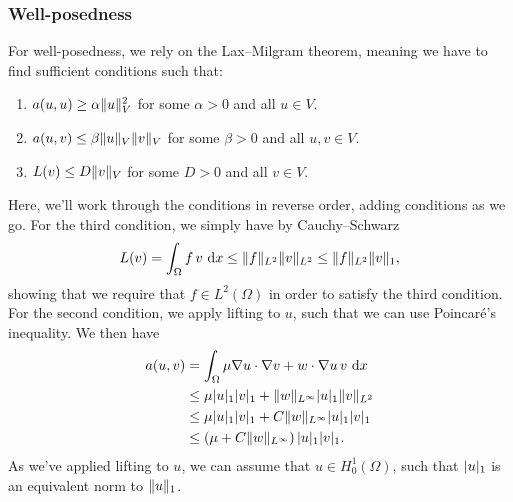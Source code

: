 \subsubsection{Well-posedness}
For well-posedness, we rely on the Lax--Milgram theorem, meaning we have to find sufficient conditions such that: %
\begin{enumerate}
    \item $a(u, u) \geq \alpha \lVert u\rVert^2_V$ for some $\alpha > 0$ and all $u \in V$.
    \item $a(u, v) \leq \beta \lVert u\rVert_V \lVert v\rVert_V$ for some $\beta > 0$ and all $u, v \in V$.
    \item $L(v) \leq D \lVert v\rVert_V$ for some $D > 0$ and all $v \in V$.
\end{enumerate}

Here, we'll work through the conditions in reverse order, adding conditions as we go.
For the third condition, we simply have by Cauchy--Schwarz %
\begin{equation}
    L(v) = \int_\Omega f \, v \, \mathop{}\!\mathrm{d} x \leq \lVert f\rVert_{L^2} \lVert v\rVert_{L^2} \leq \lVert f\rVert_{L^2} \lVert v\rVert_1,
\end{equation}
showing that we require that $f \in L^2(\Omega)$ in order to satisfy the third condition.
For the second condition, we apply lifting to $u$, such that we can use Poincaré's inequality.
We then have
\begin{align*}
    a(u, v)
    &= \int_{\Omega} \mu \nabla u \cdot \nabla v + w \cdot \nabla u \, v \, \mathop{}\!\mathrm{d} x \\
    &\leq \mu \lvert u\rvert_1 \lvert v\rvert_1 + \lVert w\rVert_{L^\infty} \lvert u\rvert_1 \lVert v\rVert_{L^2} \\
    &\leq \mu \lvert u\rvert_1 \lvert v\rvert_1 + C \lVert w\rVert_{L^\infty} \lvert u\rvert_1 \lvert v\rvert_1 \\
    &\leq \left( \mu + C \lVert w\rVert_{L^\infty} \right) \lvert u\rvert_1 \lvert v\rvert_1.
\end{align*}
As we've applied lifting to $u$, we can assume that $u \in H^1_0(\Omega)$, such that $\lvert u\rvert_1$ is an equivalent norm to $\lVert u\rVert_1$.

